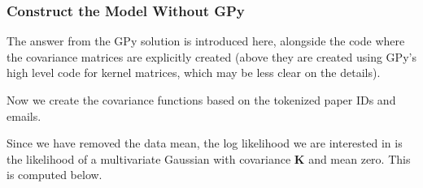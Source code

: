 \hypertarget{construct-the-model-without-gpy}{%
\subsubsection{Construct the Model Without
GPy}\label{construct-the-model-without-gpy}}

The answer from the GPy solution is introduced here, alongside the code
where the covariance matrices are explicitly created (above they are
created using GPy's high level code for kernel matrices, which may be
less clear on the details).

\begin{Shaded}
\begin{Highlighting}[]
\OperatorTok{=}
\OperatorTok{=}\OperatorTok{/}
\OperatorTok{=}\OperatorTok{/}
\end{Highlighting}
\end{Shaded}

Now we create the covariance functions based on the tokenized paper IDs
and emails.

\begin{Shaded}
\begin{Highlighting}[]
\OperatorTok{=}
\OperatorTok{=}\OperatorTok{*}
\OperatorTok{=}\OperatorTok{+}\OperatorTok{+}\OperatorTok{*}\NormalTok{np.eye(X2.shape[}\NormalTok{])}
\OperatorTok{=}
\OperatorTok{=}\OperatorTok{{-}}
\OperatorTok{=}
\OperatorTok{=}
\OperatorTok{=}\OperatorTok{/}
\end{Highlighting}
\end{Shaded}

Since we have removed the data mean, the log likelihood we are
interested in is the likelihood of a multivariate Gaussian with
covariance \(\mathbf{K}\) and mean zero. This is computed below.

